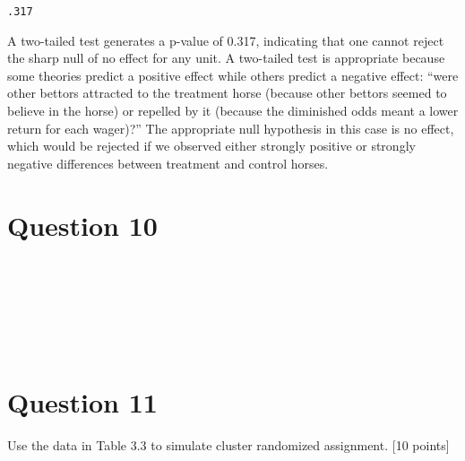 \documentclass[11pt,notitlepage]{article}\usepackage[]{graphicx}\usepackage[]{color}
\makeatletter
\newenvironment{kframe}{%
 \def\at@end@of@kframe{}%
 \ifinner\ifhmode%
  \def\at@end@of@kframe{\end{minipage}}%
  \begin{minipage}{\columnwidth}%
 \fi\fi%
 \def\FrameCommand##1{\hskip\@totalleftmargin \hskip-\fboxsep
 \colorbox{shadecolor}{##1}\hskip-\fboxsep
     \hskip-\linewidth \hskip-\@totalleftmargin \hskip\columnwidth}%
 \MakeFramed {\advance\hsize-\width
   \@totalleftmargin\z@ \linewidth\hsize
   \@setminipage}}%
 {\par\unskip\endMakeFramed%
 \at@end@of@kframe}
\newenvironment{knitrout}{}{} %
\makeatother
\begin{document}
\begin{enumerate}[a)]
\begin{knitrout}
\begin{kframe}
    \begin{Verbatim}[commandchars=\\\{\}]
.317

    \end{Verbatim}

\end{kframe}
\end{knitrout}
A two-tailed test generates a p-value of 0.317, indicating that one cannot reject the sharp null of no effect for any unit. A two-tailed test is appropriate because some theories predict a positive effect while others predict a negative effect: ``were other bettors attracted to the treatment horse (because other bettors seemed to believe in the horse) or repelled by it (because the diminished odds meant a lower return for each wager)?''  The appropriate null hypothesis in this case is no effect, which would be rejected if we observed either strongly positive or strongly negative differences between treatment and control horses.
\end{enumerate}

\section*{Question 10}
\begin{knitrout}
\color{fgcolor}\begin{kframe}
\begin{verbatim}







\end{verbatim}
\end{kframe}
\end{knitrout}


\section*{Question 11}

Use the data in Table 3.3 to simulate cluster randomized assignment. [10 points]
\end{document}
